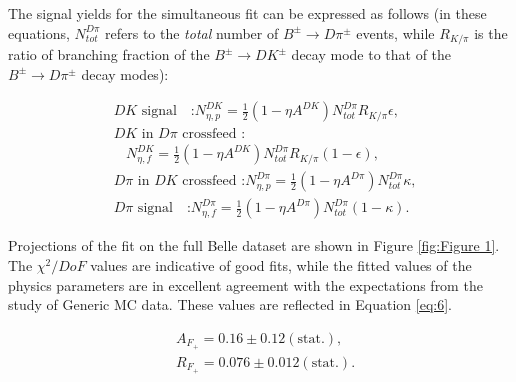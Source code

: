 \documentclass[aps,prl,twocolumn,superscriptaddress,showpacs,preprintnumbers,amsmath,amssymb]{revtex4}
\begin{document}
The signal yields for the simultaneous fit can be expressed as follows (in these equations, $N_{tot}^{D\pi}$ refers to the \textit{total} number of $B^{\pm} \rightarrow D\pi^{\pm}$ events, while $R_{K/\pi}$ is the ratio of branching fraction of the $B^{\pm} \rightarrow DK^{\pm}$ decay mode to that of the $B^{\pm} \rightarrow D\pi^{\pm}$ decay modes):

\begin{subequations} \label{eq:5}
\begin{align}
&DK \text{ signal ~~:}N^{DK}_{\eta, p} = \frac{1}{2}(1-\eta A^{DK})N^{D\pi}_{tot}R_{K/\pi}\epsilon ,\\
&DK \text{ in } D\pi \text{ crossfeed :} \nonumber \\
& ~~~~ N^{DK}_{\eta, f} = \frac{1}{2}(1-\eta A^{DK})N^{D\pi}_{tot}R_{K/\pi}(1- \epsilon), \\
&D\pi \text{ in } DK \text{ crossfeed :} N^{D\pi}_{\eta, p} = \frac{1}{2}(1-\eta A^{D\pi})N^{D\pi}_{tot} \kappa,\\
&D\pi \text{ signal ~~:} N^{D\pi}_{\eta, f} = \frac{1}{2}(1-\eta A^{D\pi})N^{D\pi}_{tot}(1 - \kappa).
\end{align}
\end{subequations}

Projections of the fit on the full Belle dataset are shown in Figure \ref{fig:Figure 1}. The $\chi^2/DoF$ values are indicative of good fits, while the fitted values of the physics parameters are in excellent agreement with the expectations from the study of Generic MC data. These values are reflected in Equation \ref{eq:6}.


\begin{subequations} \label{eq:6}
\begin{align}
&A_{F_{+}} =  0.16 \pm 0.12 (\mathrm{stat.}) ,\\
&R_{F_{+}} = 0.076 \pm 0.012 (\mathrm{stat.}) .
\end{align}
\end{subequations}
  
\end{document}
